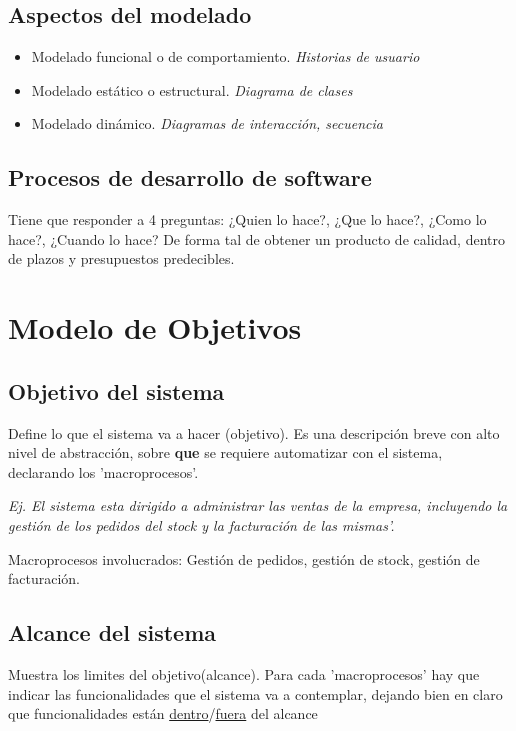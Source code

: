 \documentclass[titlepage,a4paper]{article}
\begin{document}
\subsection*{Aspectos del modelado}
    \begin{itemize}
        \item Modelado funcional o de comportamiento. \textit{Historias de usuario}
        \item Modelado estático o estructural. \textit{Diagrama de clases}
        \item Modelado dinámico. \textit{Diagramas de interacción, secuencia}
    \end{itemize}

\subsection{Procesos de desarrollo de software}

Tiene que responder a 4 preguntas: ¿Quien lo hace?, ¿Que lo hace?, ¿Como lo hace?, ¿Cuando lo hace?
De forma tal de obtener un producto de calidad, dentro de plazos y presupuestos predecibles.

\section{Modelo de Objetivos}
\subsection{Objetivo del sistema}
Define lo que el sistema va a hacer (objetivo).
Es una descripción breve con alto nivel de abstracción, sobre \textbf{que} se requiere automatizar con el sistema, declarando los 'macroprocesos'.

\textit{Ej.
El sistema esta dirigido a administrar las ventas de la empresa, incluyendo la gestión de los pedidos del stock y la facturación de las mismas'.}

Macroprocesos involucrados: Gestión de pedidos, gestión de stock, gestión de facturación.

\subsection{Alcance del sistema}
Muestra los limites del objetivo(alcance). Para cada 'macroprocesos' hay que indicar las funcionalidades que el sistema va a contemplar,
dejando bien en claro que funcionalidades están \underline{dentro}/\underline{fuera} del alcance
\end{document}
